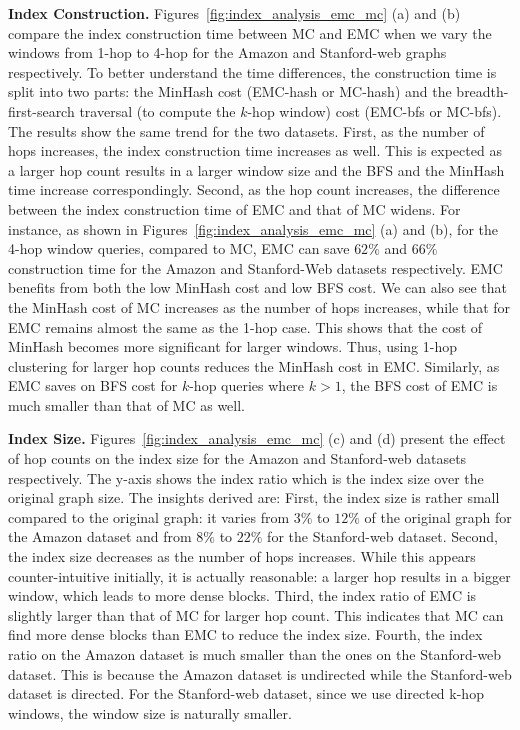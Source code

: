 \textbf{Index Construction. } Figures~\ref{fig:index_analysis_emc_mc} 
(a) and (b) compare the index construction time between MC and EMC 
when we vary the windows from 1-hop to 4-hop for the Amazon and Stanford-web 
graphs respectively. To better understand the time differences, 
the construction time is split into two parts: 
the MinHash cost (EMC-hash or MC-hash) and the breadth-first-search traversal (to compute the $k$-hop window)  cost (EMC-bfs or MC-bfs). The results show the same trend 
for the two datasets. %
First, as the number of hops increases, the index construction time increases as well. 
This is expected as a larger hop count results in a larger window size 
and the BFS and the MinHash time increase correspondingly. 
Second, as the hop count increases, the difference between the
index construction time of EMC and that of MC widens. 
For instance, as shown in Figures~\ref{fig:index_analysis_emc_mc} (a) and (b), for the 4-hop window queries, compared to MC, 
EMC can save $62\%$ and $66\%$ construction time for the Amazon and Stanford-Web datasets respectively.
EMC benefits from both the low MinHash cost and low BFS cost. 
We can also see that the MinHash cost of MC increases as the number of hops 
increases, while that for EMC remains almost the same as the 1-hop case. 
This shows that the cost of MinHash becomes more significant for larger windows. 
Thus, using 1-hop clustering for larger hop counts reduces the MinHash cost 
in EMC. Similarly, as EMC saves on BFS cost for $k$-hop queries where $k > 1$, 
the BFS cost of EMC is much smaller than that of MC as well. 

\textbf{Index Size.} Figures~\ref{fig:index_analysis_emc_mc} (c) and (d) 
present the effect of hop counts on the index size for the Amazon and Stanford-web 
datasets respectively. The y-axis shows the index ratio which is the index size over the original graph size. 
The insights derived are: 
First, the index size is rather small compared to the original graph: it
varies from $3\%$ to $12\%$ of the original graph for the Amazon dataset 
and from $8\%$ to $22\%$ for the Stanford-web dataset. 
Second, the index size decreases as the number of hops increases. 
While this appears counter-intuitive initially, it is actually reasonable: a larger hop results in a bigger window, which leads
to more dense blocks. Third, the index ratio of EMC is slightly larger 
than that of MC for larger hop count. This indicates that MC can find more dense blocks 
than EMC to reduce the index size. Fourth, the index ratio on 
the Amazon dataset is much smaller than the ones on the Stanford-web dataset. 
This is because the Amazon dataset is undirected while the Stanford-web dataset
is directed. For the Stanford-web dataset, since we use directed k-hop windows, the window size is naturally smaller. 


